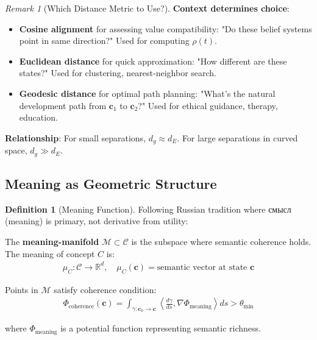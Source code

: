 \documentclass[11pt,a4paper]{article}
\theoremstyle{definition}
\newtheorem{definition}{Definition}[section]
\theoremstyle{remark}
\newtheorem{remark}{Remark}[section]
\newcommand{\RR}{\mathbb{R}}
\newcommand{\CC}{\mathcal{C}}
\newcommand{\cc}{\mathbf{c}}
\begin{document}
\begin{remark}[Which Distance Metric to Use?]
\textbf{Context determines choice}:

\begin{itemize}
    \item \textbf{Cosine alignment} for assessing value compatibility: "Do these belief systems point in same direction?" Used for computing \(\rho(t)\).
    
    \item \textbf{Euclidean distance} for quick approximation: "How different are these states?" Used for clustering, nearest-neighbor search.
    
    \item \textbf{Geodesic distance} for optimal path planning: "What's the natural development path from \(\cc_1\) to \(\cc_2\)?" Used for ethical guidance, therapy, education.
\end{itemize}

\textbf{Relationship}: For small separations, \(d_g \approx d_E\). For large separations in curved space, \(d_g \gg d_E\).
\end{remark}

\subsection{Meaning as Geometric Structure}

\begin{definition}[Meaning Function]
Following Russian tradition where смысл (meaning) is primary, not derivative from utility:

The \textbf{meaning-manifold} \(\mathcal{M} \subset \CC\) is the subspace where semantic coherence holds. The meaning of concept \(C\) is:
\begin{align}
\mu_C: \CC \rightarrow \RR^d, \quad \mu_C(\cc) = \text{semantic vector at state } \cc
\end{align}

Points in \(\mathcal{M}\) satisfy coherence condition:
\begin{align}
\Phi_{\text{coherence}}(\cc) = \int_{\gamma: \cc_0 \to \cc} \left\langle \frac{d\gamma}{ds}, \nabla \Phi_{\text{meaning}} \right\rangle ds > \theta_{\min}
\end{align}

where \(\Phi_{\text{meaning}}\) is a potential function representing semantic richness.
\end{definition}
\end{document}
